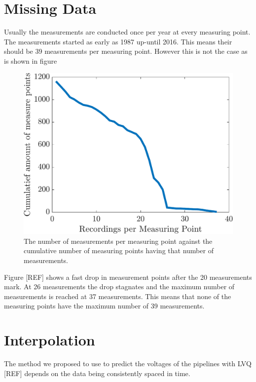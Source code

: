 
\section{Missing Data}
\label{sec:dataset:missing-data}
Usually the measurements are conducted once per year at every measuring point. The measurements started as early as 1987 up-until 2016. This means their should be 39 measurements per measuring point. However this is not the case as is shown in figure  %

\begin{figure}[!htb]
\centering
\includegraphics[width=.75\textwidth]{./gfx/chapters/data/cumulatief-recordings-per-measurepoint.pdf}
\caption{The number of measurements per measuring point against the cumulative number of measuring points having that number of measurements.}
\label{fig:dataset:cumulatief-recordings}
\end{figure}

Figure [REF] shows a fast drop in measurement points after the 20 measurements mark. At 26 measurements the drop stagnates and the maximum number of measurements is reached at 37 measurements. This means that none of the measuring points have the maximum number of 39 measurements.



\section{Interpolation}
\label{sec:dataset:interpolation}
The method we proposed to use to predict the voltages of the pipelines with LVQ [REF] depends on the data being consistently spaced in time. 

